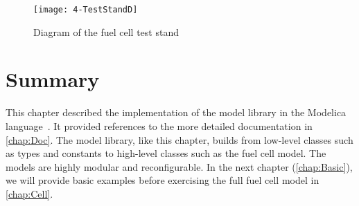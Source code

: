 \begin{figure}[htbp]
  \texttt{[image: 4-TestStandD]}%
  \caption{Diagram of the fuel cell test stand}%
  \label{fig:TestStandD}%
\end{figure}



\FloatBarrier %
\section{Summary}

This chapter described the implementation of the model library in the Modelica language~\cite{Modelica3.3}.  It provided references to the more detailed documentation in \autoref{chap:Doc}.  The model library, like this chapter, builds from low-level classes such as types and constants to high-level classes such as the fuel cell model.  The models are highly modular and reconfigurable.  In the next chapter (\autoref{chap:Basic}), we will provide basic examples before exercising the full fuel cell model in \autoref{chap:Cell}.

